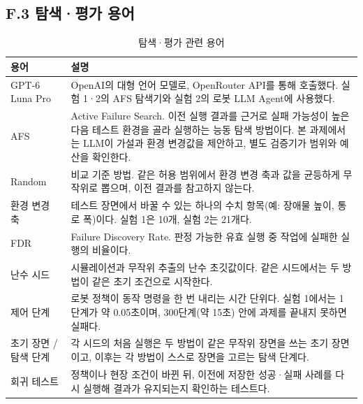 \subsection*{F.3 탐색·평가 용어}
\begin{table}[H]
\centering\small
\caption{탐색·평가 관련 용어}
\begin{tabularx}{\linewidth}{@{}p{30mm}Y@{}}
\toprule
용어 & 설명 \\
\midrule
GPT-6 Luna Pro~\cite{luna} & OpenAI의 대형 언어 모델로, OpenRouter API를 통해 호출했다. 실험 1·2의 AFS 탐색기와 실험 2의 로봇 LLM Agent에 사용했다. \\
AFS & Active Failure Search. 이전 실행 결과를 근거로 실패 가능성이 높은 다음 테스트 환경을 골라 실행하는 능동 탐색 방법이다. 본 과제에서는 LLM이 가설과 환경 변경값을 제안하고, 별도 검증기가 범위와 예산을 확인한다. \\
Random & 비교 기준 방법. 같은 허용 범위에서 환경 변경 축과 값을 균등하게 무작위로 뽑으며, 이전 결과를 참고하지 않는다. \\
환경 변경 축 & 테스트 장면에서 바꿀 수 있는 하나의 수치 항목(예: 장애물 높이, 통로 폭)이다. 실험 1은 10개, 실험 2는 21개다. \\
FDR & Failure Discovery Rate. 판정 가능한 유효 실행 중 작업에 실패한 실행의 비율이다. \\
난수 시드 & 시뮬레이션과 무작위 추출의 난수 초깃값이다. 같은 시드에서는 두 방법이 같은 초기 조건으로 시작한다. \\
제어 단계 & 로봇 정책이 동작 명령을 한 번 내리는 시간 단위다. 실험 1에서는 1단계가 약 0.05초이며, 300단계(약 15초) 안에 과제를 끝내지 못하면 실패다. \\
초기 장면 / 탐색 단계 & 각 시드의 처음 실행은 두 방법이 같은 무작위 장면을 쓰는 초기 장면이고, 이후는 각 방법이 스스로 장면을 고르는 탐색 단계다. \\
회귀 테스트 & 정책이나 현장 조건이 바뀐 뒤, 이전에 저장한 성공·실패 사례를 다시 실행해 결과가 유지되는지 확인하는 테스트다. \\
\bottomrule
\end{tabularx}
\end{table}
